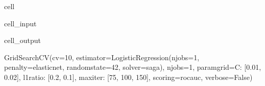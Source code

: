 \documentclass[letterpaper,10pt,english]{jupyterBook}
\begin{document}
\begin{sphinxuseclass}{cell}
\begin{sphinxVerbatimInput}
\begin{sphinxuseclass}{cell_input}
\end{sphinxuseclass}\end{sphinxVerbatimInput}
\begin{sphinxVerbatimOutput}

\begin{sphinxuseclass}{cell_output}
\begin{sphinxVerbatim}[commandchars=\\\{\}]
GridSearchCV(cv=10,
             estimator=LogisticRegression(n\PYGZus{}jobs=\PYGZhy{}1, penalty=\PYGZsq{}elasticnet\PYGZsq{},
                                          random\PYGZus{}state=42, solver=\PYGZsq{}saga\PYGZsq{}),
             n\PYGZus{}jobs=\PYGZhy{}1,
             param\PYGZus{}grid=\PYGZob{}\PYGZsq{}C\PYGZsq{}: [0.01, 0.02], \PYGZsq{}l1\PYGZus{}ratio\PYGZsq{}: [0.2, 0.1],
                         \PYGZsq{}max\PYGZus{}iter\PYGZsq{}: [75, 100, 150]\PYGZcb{},
             scoring=\PYGZsq{}roc\PYGZus{}auc\PYGZsq{}, verbose=False)
\end{sphinxVerbatim}

\end{sphinxuseclass}\end{sphinxVerbatimOutput}

\end{sphinxuseclass}
\end{document}
